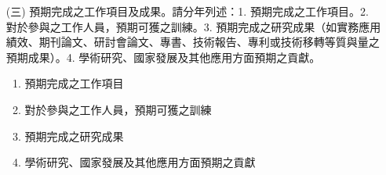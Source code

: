 \documentclass[12pt,a4paper]{article}
\begin{document}
\begin{enumerate}
\item[(三)] 預期完成之工作項目及成果。請分年列述：1. 預期完成之工作項目。2. 對於參與之工作人員，預期可獲之訓練。3. 預期完成之研究成果（如實務應用績效、期刊論文、研討會論文、專書、技術報告、專利或技術移轉等質與量之預期成果）。4. 學術研究、國家發展及其他應用方面預期之貢獻。
\begin{enumerate}[label=\arabic*.]
\item 預期完成之工作項目\\
\item 對於參與之工作人員，預期可獲之訓練\\
\item 預期完成之研究成果\\
\item 學術研究、國家發展及其他應用方面預期之貢獻\\
\end{enumerate}

\end{enumerate}	

\label{LastPage}
\end{document}
